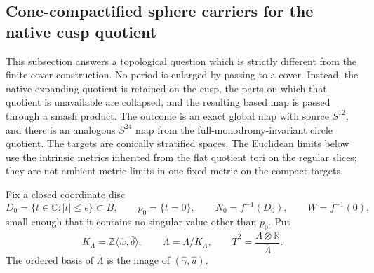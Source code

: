 \subsection{Cone-compactified sphere carriers for the native cusp quotient}
\label{wb:cusp-cone-section}

This subsection answers a topological question which is strictly different
from the finite-cover construction.  No period is enlarged by passing to a
cover.  Instead, the native expanding quotient is retained on the cusp, the
parts on which that quotient is unavailable are collapsed, and the resulting
based map is passed through a smash product.  The outcome is an exact global
map with source \(S^{12}\), and there is an analogous \(S^{24}\) map from the
full-monodromy-invariant circle quotient.  The targets are conically
stratified spaces.  The Euclidean limits below use the intrinsic metrics
inherited from the flat quotient tori on the regular slices; they are not
ambient metric limits in one fixed metric
on the compact targets.

Fix a closed coordinate disc
\begin{equation}
 D_0=\{t\in\mathbb C:|t|\leq\epsilon\}\subset B,\qquad
 p_0=\{t=0\},\qquad N_0=f^{-1}(D_0),\qquad W=f^{-1}(0),
 \label{wb:cusp-cone-disc}
\end{equation}
small enough that it contains no singular value other than \(p_0\).  Put
\begin{equation}
 K_\Lambda=\mathbb Z\langle\widehat w,\widehat\delta\rangle,\qquad
 \overline\Lambda=\Lambda/K_\Lambda,\qquad
 \overline T^2=
 \frac{\overline\Lambda\otimes\mathbb R}{\overline\Lambda}.
 \label{wb:cusp-cone-quotient-lattice}
\end{equation}
The ordered basis of \(\overline\Lambda\) is the image of
\((\widehat\gamma,\widehat u)\).

